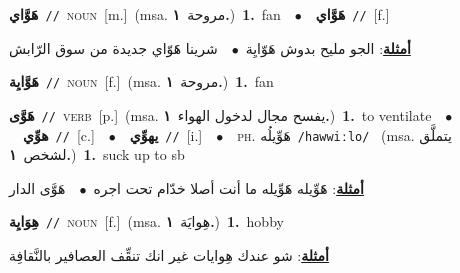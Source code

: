 \documentclass[10pt,a4paper,twoside]{article} %
\begin{document}
\begin{multicols}{2}
{\setlength\topsep{0pt}\textbf{\foreignlanguage{arabic}{هَوَّاي}}\ {\color{gray}\texttt{//}\color{black}}\ \textsc{noun}\ [m.]\ \color{gray}(msa. \foreignlanguage{arabic}{مروحة}~\foreignlanguage{arabic}{\textbf{١.}})\color{black}\ \textbf{1.}~fan\ \ $\bullet$\ \ \setlength\topsep{0pt}\textbf{\foreignlanguage{arabic}{هَوَّاي}}\ {\color{gray}\texttt{//}\color{black}}\ [f.]\  \begin{flushright}\color{gray}\foreignlanguage{arabic}{\textbf{\underline{\foreignlanguage{arabic}{أمثلة}}}: الجو مليح بدوش هَوّايِة\ $\bullet$\ \  شرينا هََوّاي جديدة من سوق الرّابش}\end{flushright}\color{black}} \vspace{2mm}

{\setlength\topsep{0pt}\textbf{\foreignlanguage{arabic}{هَوَّايِة}}\ {\color{gray}\texttt{//}\color{black}}\ \textsc{noun}\ [f.]\ \color{gray}(msa. \foreignlanguage{arabic}{مروحة}~\foreignlanguage{arabic}{\textbf{١.}})\color{black}\ \textbf{1.}~fan\ } \vspace{2mm}

{\setlength\topsep{0pt}\textbf{\foreignlanguage{arabic}{هَوَّى}}\ {\color{gray}\texttt{//}\color{black}}\ \textsc{verb}\ [p.]\ \color{gray}(msa. \foreignlanguage{arabic}{يفسح مجال لدخول الهواء}~\foreignlanguage{arabic}{\textbf{١.}})\color{black}\ \textbf{1.}~to ventilate\ \ $\bullet$\ \ \setlength\topsep{0pt}\textbf{\foreignlanguage{arabic}{هوِّي}}\ {\color{gray}\texttt{//}\color{black}}\ [c.]\ \ $\bullet$\ \ \setlength\topsep{0pt}\textbf{\foreignlanguage{arabic}{يهوِّي}}\ {\color{gray}\texttt{//}\color{black}}\ [i.]\ \ $\bullet$\ \ \textsc{ph.} \color{gray} \foreignlanguage{arabic}{هَوِّيلُه}\color{black}\ {\color{gray}\texttt{/{\sffamily hawwiːlo}/}\color{black}}\ \color{gray} (msa. \foreignlanguage{arabic}{يتملَّق لشخص}~\foreignlanguage{arabic}{\textbf{١.}})\color{black}\ \textbf{1.}~suck up to sb\  \begin{flushright}\color{gray}\foreignlanguage{arabic}{\textbf{\underline{\foreignlanguage{arabic}{أمثلة}}}: هََوِّيله هََوِّيله ما أنت أصلا خدّام تحت اجره\ $\bullet$\ \  هَوَّى الدار}\end{flushright}\color{black}} \vspace{2mm}

{\setlength\topsep{0pt}\textbf{\foreignlanguage{arabic}{هِوَايِة}}\ {\color{gray}\texttt{//}\color{black}}\ \textsc{noun}\ [f.]\ \color{gray}(msa. \foreignlanguage{arabic}{هِوايَة}~\foreignlanguage{arabic}{\textbf{١.}})\color{black}\ \textbf{1.}~hobby\  \begin{flushright}\color{gray}\foreignlanguage{arabic}{\textbf{\underline{\foreignlanguage{arabic}{أمثلة}}}: شو عندك هِوايات غير انك تنقِّف العصافير بالنَّقافِة}\end{flushright}\color{black}} \vspace{2mm}


\end{multicols}
\end{document}
